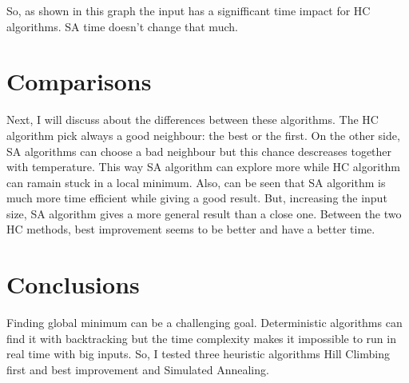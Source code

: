 \documentclass[12pt]{article}
\begin{document}


So, as shown in this graph the input has a signifficant time impact for HC algorithms. SA time doesn't change that much. 


\section{Comparisons}
Next, I will discuss about the differences between these algorithms. The HC algorithm pick always a good neighbour: the best or the first. On the other side, SA algorithms
can choose a bad neighbour but this chance descreases together with temperature. This way SA algorithm can explore more while HC algorithm can ramain stuck in a local minimum.
Also, can be seen that SA algorithm is much more time efficient while giving a good result. But, increasing the input size, SA algorithm gives a more general result than a close one.
Between the two HC methods, best improvement seems to be better and have a better time.

\section{Conclusions}
Finding global minimum can be a challenging goal. Deterministic algorithms can find it with backtracking but the time complexity makes it impossible to run in real time with big inputs.
So, I tested three heuristic algorithms Hill Climbing first and best improvement and Simulated Annealing. 
\end{document}
